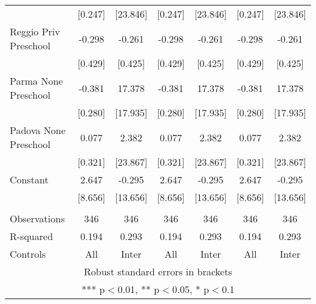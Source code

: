 \begin{tabular}{lcccccc}
 & [0.247] & [23.846] & [0.247] & [23.846] & [0.247] & [23.846] \\
Reggio Priv Preschool & -0.298 & -0.261 & -0.298 & -0.261 & -0.298 & -0.261 \\
 & [0.429] & [0.425] & [0.429] & [0.425] & [0.429] & [0.425] \\
Parma None Preschool & -0.381 & 17.378 & -0.381 & 17.378 & -0.381 & 17.378 \\
 & [0.280] & [17.935] & [0.280] & [17.935] & [0.280] & [17.935] \\
Padova None Preschool & 0.077 & 2.382 & 0.077 & 2.382 & 0.077 & 2.382 \\
 & [0.321] & [23.867] & [0.321] & [23.867] & [0.321] & [23.867] \\
Constant & 2.647 & -0.295 & 2.647 & -0.295 & 2.647 & -0.295 \\
 & [8.656] & [13.656] & [8.656] & [13.656] & [8.656] & [13.656] \\
 &  &  &  &  &  &  \\
Observations & 346 & 346 & 346 & 346 & 346 & 346 \\
R-squared & 0.194 & 0.293 & 0.194 & 0.293 & 0.194 & 0.293 \\
 Controls & All & Inter & All & Inter & All & Inter \\ \hline
\multicolumn{7}{c}{ Robust standard errors in brackets} \\
\multicolumn{7}{c}{ *** p$<$0.01, ** p$<$0.05, * p$<$0.1} \\
\end{tabular}
